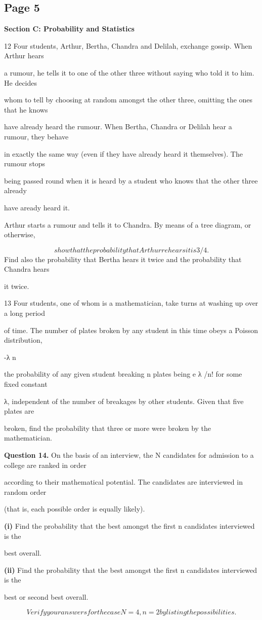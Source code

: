 \documentclass[12pt]{article}
\begin{document}
\subsection*{Page 5}
\begin{flushleft}
\bigskip\textbf{Section C: Probability and Statistics}\par
12 Four students, Arthur, Bertha, Chandra and Delilah, exchange gossip. When Arthur hears\par
a rumour, he tells it to one of the other three without saying who told it to him. He decides\par
whom to tell by choosing at random amongst the other three, omitting the ones that he knows\par
have already heard the rumour. When Bertha, Chandra or Delilah hear a rumour, they behave\par
in exactly the same way (even if they have already heard it themselves). The rumour stops\par
being passed round when it is heard by a student who knows that the other three already\par
have aready heard it.\par
Arthur starts a rumour and tells it to Chandra. By means of a tree diagram, or otherwise,\par
\[show that the probability that Arthur rehears it is 3/4.\]
Find also the probability that Bertha hears it twice and the probability that Chandra hears\par
it twice.\par
13 Four students, one of whom is a mathematician, take turns at washing up over a long period\par
of time. The number of plates broken by any student in this time obeys a Poisson distribution,\par
-λ n\par
the probability of any given student breaking n plates being e λ /n! for some fixed constant\par
λ, independent of the number of breakages by other students. Given that five plates are\par
broken, find the probability that three or more were broken by the mathematician.\par
\bigskip\textbf{Question 14.} On the basis of an interview, the N candidates for admission to a college are ranked in order\par
according to their mathematical potential. The candidates are interviewed in random order\par
(that is, each possible order is equally likely).\par
\textbf{(i)} Find the probability that the best amongst the first n candidates interviewed is the\par
best overall.\par
\textbf{(ii)} Find the probability that the best amongst the first n candidates interviewed is the\par
best or second best overall.\par
\[Verify your answers for the case N = 4, n = 2 by listing the possibilities.\]
\end{flushleft}
\end{document}

